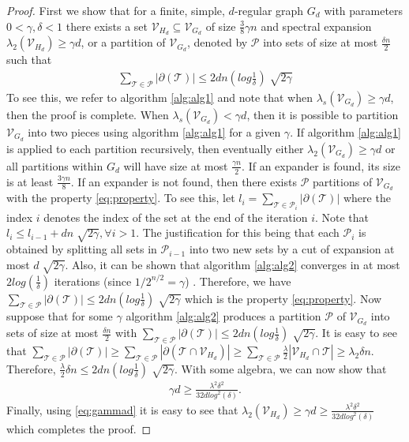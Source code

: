 \documentclass[reqno,8pt]{amsart}
\theoremstyle{definition}
\theoremstyle{remark}
\numberwithin{equation}{section}
\def\cV{\mathcal{V}}
\def\cT{\mathcal{T}}
\def\cP{\mathcal{P}}
\def\cVGD{\mathcal{V}_{G_d}}
\def\cVHD{\mathcal{V}_{H_d}}
\begin{document}
\begin{proof}
First we show that for a finite, simple, $d$-regular graph $G_d$ with parameters $0<\gamma, \delta < 1$ there exists a set $\cV_{H_d} \subseteq \cV_{G_d}$ of size $\frac{3}{8}\gamma n$ and spectral expansion $\lambda_2 (\cV_{H_d}) \geq \gamma d$, or a partition of $\cV_{G_d}$, denoted by $\cP$ into sets of size at most $\frac{\delta n}{2}$ such that
\begin{align}
\sum_{\cT \in \cP} |\partial (\cT)| \leq 2dn\left(log\frac{1}{\delta}\right)\sqrt[]{2\gamma} \label{eq:property}
\end{align}
To see this, we refer to algorithm \ref{alg:alg1} and note that when $\lambda_s(\cVGD) \geq \gamma d$, then the proof is complete. When $\lambda_s (\cVGD) < \gamma d$, then it is possible to partition $\cVGD$ into two pieces using algorithm \ref{alg:alg1} for a given $\gamma$. If algorithm \ref{alg:alg1} is applied to each partition recursively, then eventually either $\lambda_2(\cVGD) \geq \gamma d$ or all partitions within $G_d$ will have size at most $\frac{\gamma n}{2}$. If an expander is found, its size is at least $\frac{3 \gamma n}{8}$. If an expander is not found, then there exists $\cP$ partitions of $\cVGD$ with the property \ref{eq:property}. To see this, let $l_i = \sum_{\cT \in \cP_i} |\partial (\cT)|$ where the index $i$ denotes the index of the set at the end of the iteration $i$. Note that $l_i \leq l_{i-1} + dn\sqrt[]{2\gamma},\forall i>1$. The justification for this being that each $\cP_i$ is obtained by splitting all sets in $\cP_{i-1}$ into two new sets by a cut of expansion at most $d\sqrt[]{2\gamma}$. Also, it can be shown that algorithm \ref{alg:alg2} converges in at most $2log\left(\frac{1}{\delta}\right)$ iterations (since $1/2^{n/2}=\gamma$) \cite{Algs2001}. Therefore, we have $\sum_{\cT \in \cP} |\partial(\cT)| \leq 2dn\left(log\frac{1}{\delta}\right)\sqrt[]{2\gamma}$ which is the property \ref{eq:property}. Now suppose that for some $\gamma$ algorithm \ref{alg:alg2} produces a partition $\cP$ of $\cVGD$ into sets of size at most $\frac{\delta n}{2}$ with $\sum_{\cT \in \cP} |\partial(\cT)| \leq 2dn\left(log\frac{1}{\delta}\right)\sqrt[]{2\gamma}$.  It is easy to see that $\sum_{\cT \in \cP} |\partial(\cT)| \geq \sum_{\cT \in \cP} |\partial(\cT \cap \cVHD)| \geq \sum_{\cT \in \cP} \frac{\lambda}{2} |\cVHD \cap \cT| \geq \lambda_2 \delta n$. Therefore, $\frac{\lambda}{2} \delta n \leq 2dn\left(log\frac{1}{\delta}\right)\sqrt[]{2\gamma}$. With some algebra, we can now show that 
\begin{align}
\gamma d \geq \frac{\lambda^2 \delta^2}{32dlog^2(\delta)}. \label{eq:gammad}
\end{align}
Finally, using \ref{eq:gammad} it is easy to see that $\lambda_2 (\cVHD) \geq \gamma d \geq \frac{\lambda^2 \delta^2}{32dlog^2(\delta)}$ which completes the proof. 
\end{proof}
\end{document}
